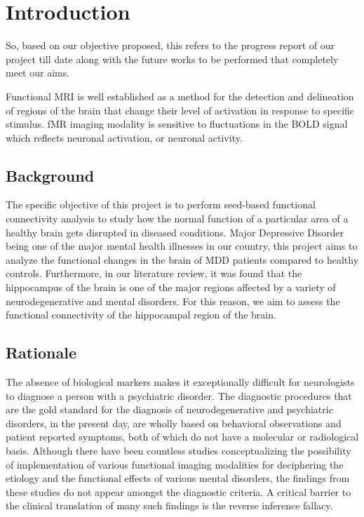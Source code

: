 \documentclass[12pt]{article}
\begin{document}
\newpage

\begingroup
  \fontsize{12pt}{12pt}\selectfont

\vskip -10pt
\enlargethispage{\baselineskip}
\thispagestyle{empty}
\addcontentsline{}{}{}
\tableofcontents

\endgroup
\newpage

\clearpage
\setcounter{page}{1}

\section{Introduction}

So, based on our objective proposed, this refers to the progress
report of our project till date along with the future works to be
performed that completely meet our aims.

Functional MRI is well established as a method for the detection and
delineation of regions of the brain that change their level of
activation in response to specific stimulus. fMR imaging modality
is sensitive to fluctuations in the BOLD signal which reflects
neuronal activation, or neuronal activity.


\subsection{Background}

The specific objective of this project is to perform seed-based
functional connectivity analysis to study how the normal function of a
particular area of a healthy brain gets disrupted in diseased
conditions. Major Depressive Disorder being one of the major mental
health illnesses in our country, this project aims to analyze the
functional changes in the brain of MDD patients compared to healthy
controls. Furthermore, in our literature review, it was found that the
hippocampus of the brain is one of the major regions affected by a
variety of neurodegenerative and mental disorders. For this reason, we
aim to assess the functional connectivity of the hippocampal region of
the brain.

\subsection{Rationale}

The absence of biological markers makes it exceptionally difficult for
neurologists to diagnose a person with a psychiatric disorder. The
diagnostic procedures that are the gold standard for the diagnosis of
neurodegenerative and psychiatric disorders, in the present day, are
wholly based on behavioral observations and patient reported symptoms,
both of which do not have a molecular or radiological basis. Although
there have been countless studies conceptualizing the possibility of
implementation of various functional imaging modalities for
deciphering the etiology and the functional effects of various mental
disorders, the findings from these studies do not appear amongst the
diagnostic criteria. A critical barrier to the clinical translation of
many such findings is the reverse inference fallacy.
\end{document}
